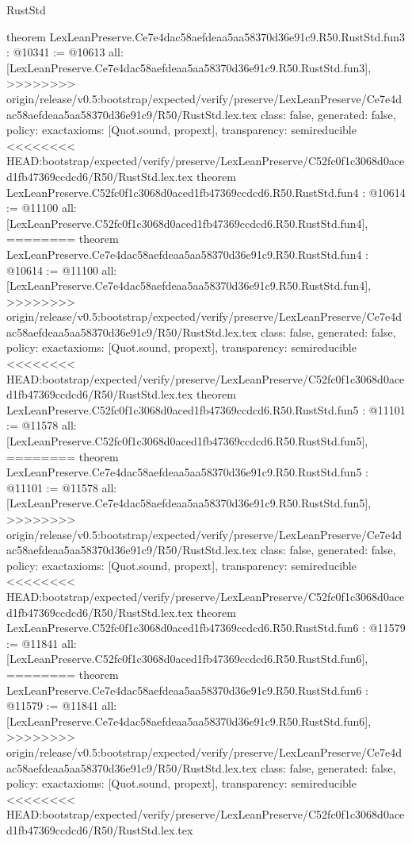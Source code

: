 \begin{lexlean}{RustStd}
\begin{coremodule}
{\begin{coremodule}
{{{{{{theorem LexLeanPreserve.Ce7e4dac58aefdeaa5aa58370d36e91c9.R50.RustStd.fun3 : @10341 := @10613 {
  all: [LexLeanPreserve.Ce7e4dac58aefdeaa5aa58370d36e91c9.R50.RustStd.fun3],
>>>>>>>> origin/release/v0.5:bootstrap/expected/verify/preserve/LexLeanPreserve/Ce7e4dac58aefdeaa5aa58370d36e91c9/R50/RustStd.lex.tex
  class: false,
  generated: false,
  policy: exact{axioms: [Quot.sound, propext]},
  transparency: semireducible
}
<<<<<<<< HEAD:bootstrap/expected/verify/preserve/LexLeanPreserve/C52fc0f1c3068d0aced1fb47369ccdcd6/R50/RustStd.lex.tex
theorem LexLeanPreserve.C52fc0f1c3068d0aced1fb47369ccdcd6.R50.RustStd.fun4 : @10614 := @11100 {
  all: [LexLeanPreserve.C52fc0f1c3068d0aced1fb47369ccdcd6.R50.RustStd.fun4],
========
theorem LexLeanPreserve.Ce7e4dac58aefdeaa5aa58370d36e91c9.R50.RustStd.fun4 : @10614 := @11100 {
  all: [LexLeanPreserve.Ce7e4dac58aefdeaa5aa58370d36e91c9.R50.RustStd.fun4],
>>>>>>>> origin/release/v0.5:bootstrap/expected/verify/preserve/LexLeanPreserve/Ce7e4dac58aefdeaa5aa58370d36e91c9/R50/RustStd.lex.tex
  class: false,
  generated: false,
  policy: exact{axioms: [Quot.sound, propext]},
  transparency: semireducible
}
<<<<<<<< HEAD:bootstrap/expected/verify/preserve/LexLeanPreserve/C52fc0f1c3068d0aced1fb47369ccdcd6/R50/RustStd.lex.tex
theorem LexLeanPreserve.C52fc0f1c3068d0aced1fb47369ccdcd6.R50.RustStd.fun5 : @11101 := @11578 {
  all: [LexLeanPreserve.C52fc0f1c3068d0aced1fb47369ccdcd6.R50.RustStd.fun5],
========
theorem LexLeanPreserve.Ce7e4dac58aefdeaa5aa58370d36e91c9.R50.RustStd.fun5 : @11101 := @11578 {
  all: [LexLeanPreserve.Ce7e4dac58aefdeaa5aa58370d36e91c9.R50.RustStd.fun5],
>>>>>>>> origin/release/v0.5:bootstrap/expected/verify/preserve/LexLeanPreserve/Ce7e4dac58aefdeaa5aa58370d36e91c9/R50/RustStd.lex.tex
  class: false,
  generated: false,
  policy: exact{axioms: [Quot.sound, propext]},
  transparency: semireducible
}
<<<<<<<< HEAD:bootstrap/expected/verify/preserve/LexLeanPreserve/C52fc0f1c3068d0aced1fb47369ccdcd6/R50/RustStd.lex.tex
theorem LexLeanPreserve.C52fc0f1c3068d0aced1fb47369ccdcd6.R50.RustStd.fun6 : @11579 := @11841 {
  all: [LexLeanPreserve.C52fc0f1c3068d0aced1fb47369ccdcd6.R50.RustStd.fun6],
========
theorem LexLeanPreserve.Ce7e4dac58aefdeaa5aa58370d36e91c9.R50.RustStd.fun6 : @11579 := @11841 {
  all: [LexLeanPreserve.Ce7e4dac58aefdeaa5aa58370d36e91c9.R50.RustStd.fun6],
>>>>>>>> origin/release/v0.5:bootstrap/expected/verify/preserve/LexLeanPreserve/Ce7e4dac58aefdeaa5aa58370d36e91c9/R50/RustStd.lex.tex
  class: false,
  generated: false,
  policy: exact{axioms: [Quot.sound, propext]},
  transparency: semireducible
}
<<<<<<<< HEAD:bootstrap/expected/verify/preserve/LexLeanPreserve/C52fc0f1c3068d0aced1fb47369ccdcd6/R50/RustStd.lex.tex
}}}}}}}}}
\end{coremodule}}
\end{coremodule}
\end{lexlean}
